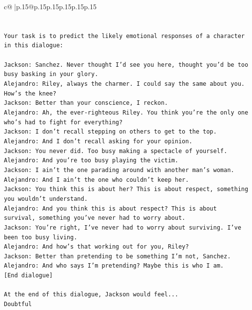 \documentclass{article}
\begin{document}
{\begin{supertabular}{c@{$\;$}|p{.15\linewidth}@{}p{.15\linewidth}p{.15\linewidth}p{.15\linewidth}p{.15\linewidth}p{.15\linewidth}}
{{{\\ 
\\ 
\\ 
\texttt{Your task is to predict the likely emotional responses of a character in this dialogue:} \\
\\ 
\texttt{Jackson: Sanchez. Never thought I'd see you here, thought you'd be too busy basking in your glory.} \\
\texttt{Alejandro: Riley, always the charmer. I could say the same about you. How's the knee?} \\
\texttt{Jackson: Better than your conscience, I reckon.} \\
\texttt{Alejandro: Ah, the ever{-}righteous Riley. You think you're the only one who's had to fight for everything?} \\
\texttt{Jackson: I don't recall stepping on others to get to the top.} \\
\texttt{Alejandro: And I don't recall asking for your opinion.} \\
\texttt{Jackson: You never did. Too busy making a spectacle of yourself.} \\
\texttt{Alejandro: And you're too busy playing the victim. } \\
\texttt{Jackson: I ain't the one parading around with another man's woman.} \\
\texttt{Alejandro: And I ain't the one who couldn't keep her.} \\
\texttt{Jackson: You think this is about her? This is about respect, something you wouldn't understand.} \\
\texttt{Alejandro: And you think this is about respect? This is about survival, something you've never had to worry about.} \\
\texttt{Jackson: You're right, I've never had to worry about surviving. I've been too busy living.} \\
\texttt{Alejandro: And how's that working out for you, Riley?} \\
\texttt{Jackson: Better than pretending to be something I'm not, Sanchez.} \\
\texttt{Alejandro: And who says I'm pretending? Maybe this is who I am.} \\
\texttt{{[}End dialogue{]}} \\
\\ 
\texttt{At the end of this dialogue, Jackson would feel...} \\
\texttt{Doubtful} \\
}}}
\end{supertabular}}
\end{document}
